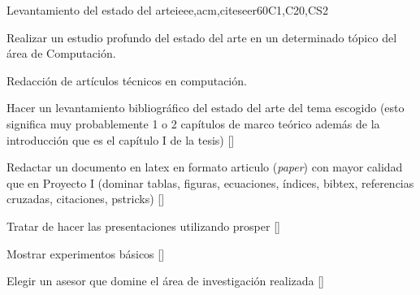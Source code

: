 \begin{syllabus}
\begin{unit}{Levantamiento del estado del arte}{}{ieee,acm,citeseer}{60}{C1,C20,CS2}
  \begin{topics}
      \item Realizar un estudio profundo del estado del arte en un determinado tópico del área de Computación.
      \item Redacción de artículos técnicos en computación.
  \end{topics}
  \begin{learningoutcomes}
      \item Hacer un levantamiento bibliográfico del estado del arte del tema escogido (esto significa muy probablemente 1 o 2 capítulos de marco teórico además de la introducción que es el capítulo I de la tesis) [\Usage]
      \item Redactar un documento en latex en formato articulo (\emph{paper}) con mayor calidad que en Proyecto I (dominar tablas, figuras, ecuaciones, índices, bibtex, referencias cruzadas, citaciones, pstricks) [\Usage]
      \item Tratar de hacer las presentaciones utilizando prosper [\Usage]
      \item Mostrar experimentos básicos [\Usage]
      \item Elegir un asesor que domine el área de investigación realizada [\Usage]
   \end{learningoutcomes}
\end{unit}



\begin{coursebibliography}
\end{coursebibliography}

\end{syllabus}

